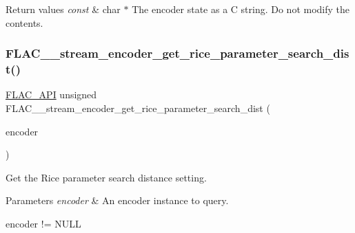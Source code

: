 \begin{DoxyRetVals}{Return values}
{\em const} & char $\ast$ The encoder state as a C string. Do not modify the contents. \\
\hline
\end{DoxyRetVals}
\mbox{\label{group__flac__stream__encoder_ga6780c051c176a3dcc4dd1a83a6309bd7}} 
\subsubsection{\texorpdfstring{F\+L\+A\+C\+\_\+\+\_\+stream\+\_\+encoder\+\_\+get\+\_\+rice\+\_\+parameter\+\_\+search\+\_\+dist()}{FLAC\_\_stream\_encoder\_get\_rice\_parameter\_search\_dist()}}
{\footnotesize\ttfamily \hyperlink{group__flac__export_ga56ca07df8a23310707732b1c0007d6f5}{F\+L\+A\+C\+\_\+\+A\+PI} unsigned F\+L\+A\+C\+\_\+\+\_\+stream\+\_\+encoder\+\_\+get\+\_\+rice\+\_\+parameter\+\_\+search\+\_\+dist (\begin{DoxyParamCaption}\item[{\hyperlink{zconf_8h_a2c212835823e3c54a8ab6d95c652660e}{const} \hyperlink{struct_f_l_a_c_____stream_encoder}{F\+L\+A\+C\+\_\+\+\_\+\+Stream\+Encoder} $\ast$}]{encoder }\end{DoxyParamCaption})}

Get the Rice parameter search distance setting.


\begin{DoxyParams}{Parameters}
{\em encoder} & An encoder instance to query.  
\begin{DoxyCode}
encoder != NULL 
\end{DoxyCode}
 \\
\hline
\end{DoxyParams}

